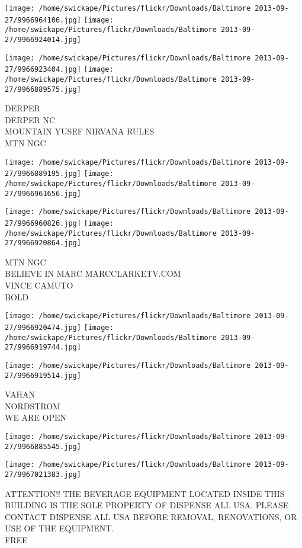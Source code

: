 \documentclass[10pt,letterpaper]{article}
\begin{document}
\texttt{[image: /home/swickape/Pictures/flickr/Downloads/Baltimore 2013-09-27/9966964106.jpg]}
\texttt{[image: /home/swickape/Pictures/flickr/Downloads/Baltimore 2013-09-27/9966924014.jpg]}

\texttt{[image: /home/swickape/Pictures/flickr/Downloads/Baltimore 2013-09-27/9966923404.jpg]}
\texttt{[image: /home/swickape/Pictures/flickr/Downloads/Baltimore 2013-09-27/9966889575.jpg]}

DERPER\\
DERPER NC\\
MOUNTAIN YUSEF NIRVANA RULES\\
MTN NGC
\pagebreak

\texttt{[image: /home/swickape/Pictures/flickr/Downloads/Baltimore 2013-09-27/9966889195.jpg]}
\texttt{[image: /home/swickape/Pictures/flickr/Downloads/Baltimore 2013-09-27/9966961656.jpg]}

\texttt{[image: /home/swickape/Pictures/flickr/Downloads/Baltimore 2013-09-27/9966960826.jpg]}
\texttt{[image: /home/swickape/Pictures/flickr/Downloads/Baltimore 2013-09-27/9966920864.jpg]}

MTN NGC\\
BELIEVE IN MARC MARCCLARKETV.COM\\
VINCE CAMUTO\\
BOLD
\pagebreak

\texttt{[image: /home/swickape/Pictures/flickr/Downloads/Baltimore 2013-09-27/9966920474.jpg]}
\texttt{[image: /home/swickape/Pictures/flickr/Downloads/Baltimore 2013-09-27/9966919744.jpg]}

\texttt{[image: /home/swickape/Pictures/flickr/Downloads/Baltimore 2013-09-27/9966919514.jpg]}

VAHAN\\
NORDSTROM\\
WE ARE OPEN
\pagebreak

\texttt{[image: /home/swickape/Pictures/flickr/Downloads/Baltimore 2013-09-27/9966885545.jpg]}

\vspace{0.25in}
\texttt{[image: /home/swickape/Pictures/flickr/Downloads/Baltimore 2013-09-27/9967021383.jpg]}

ATTENTION!! THE BEVERAGE EQUIPMENT LOCATED INSIDE THIS BUILDING IS THE SOLE PROPERTY OF DISPENSE ALL USA.  PLEASE CONTACT DISPENSE ALL USA BEFORE REMOVAL, RENOVATIONS, OR USE OF THE EQUIPMENT.\\
FREE
\pagebreak
\end{document}

